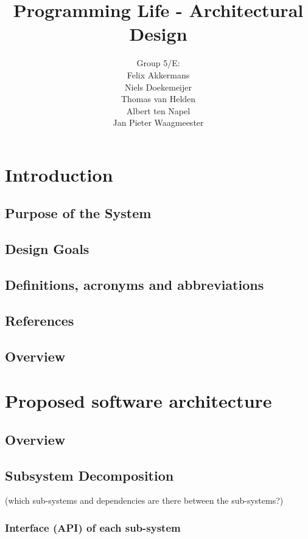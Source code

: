 \documentclass[a4paper]{article}
\title{Programming Life - Architectural Design }
\author{Group 5/E:\\
Felix Akkermans \\
Niels Doekemeijer \\
Thomas van Helden \\
Albert ten Napel \\
Jan Pieter Waagmeester}
\begin{document}
\maketitle

\vfill

\small{\tableofcontents}
\pagebreak
\section{Introduction}
\subsection{Purpose of the System}
\subsection{Design Goals}
\subsection{Definitions, acronyms and abbreviations}
\subsection{References}
\subsection{Overview}

\section{Proposed software architecture}
\subsection{Overview}
\subsection{Subsystem Decomposition}
(which sub-systems and dependencies are there between the sub-systems?)

\subsubsection{Interface (API) of each sub-system}
\end{document}
